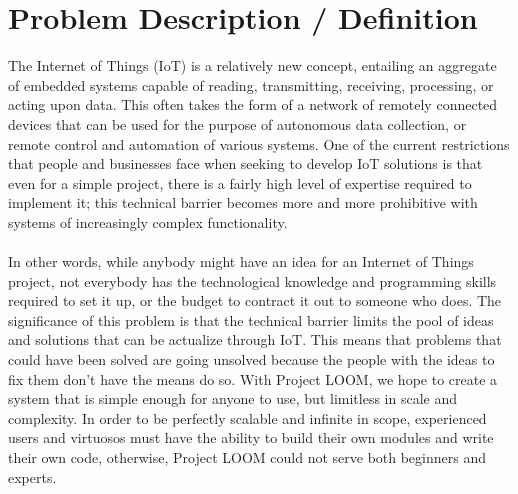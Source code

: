 \documentclass[onecolumn, draftclsnofoot,10pt, compsoc]{IEEEtran}
\begin{document}
\section{Problem Description / Definition}
    The Internet of Things (IoT) is a relatively new concept, entailing an aggregate of embedded systems capable of reading, transmitting, receiving, processing, or acting upon data. This often takes the form of a network of remotely connected devices that can be used for the purpose of autonomous data collection, or remote control and automation of various systems. One of the current restrictions that people and businesses face when seeking to develop IoT solutions is that even for a simple project, there is a fairly high level of expertise required to implement it; this technical barrier becomes more and more prohibitive with systems of increasingly complex functionality.\\ \\
    In other words, while anybody might have an idea for an Internet of Things project, not everybody has the technological knowledge and programming skills required to set it up, or the budget to contract it out to someone who does. The significance of this problem is that the technical barrier limits the pool of ideas and solutions that can be actualize through IoT. This means that problems that could have been solved are going unsolved because the people with the ideas to fix them don’t have the means do so. With Project LOOM, we hope to create a system that is simple enough for anyone to use, but limitless in scale and complexity. In order to be perfectly scalable and infinite in scope, experienced users and virtuosos must have the ability to build their own modules and write their own code, otherwise, Project LOOM could not serve both beginners and experts.
\end{document}
